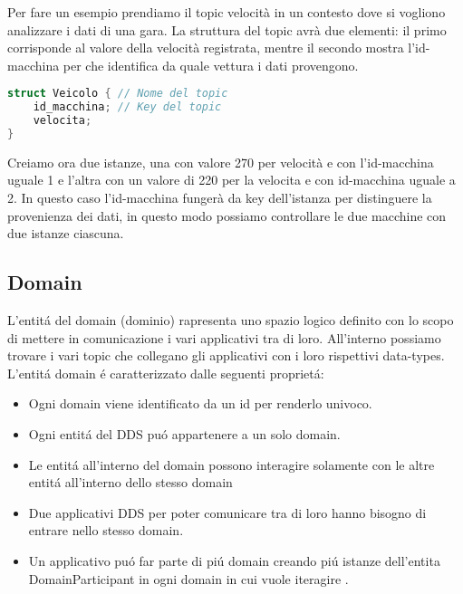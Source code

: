Per fare un esempio prendiamo il topic velocità in un contesto dove si
vogliono analizzare i dati di una gara.
La struttura del topic avrà due elementi: il primo corrisponde al valore
della velocità registrata, mentre il secondo mostra l'id-macchina per 
che identifica da quale vettura i dati provengono.

\vspace{5mm} %
\begin{lstlisting}[language=C++, caption=Esempio di Topic con una key
    usando il linguaggio IDL.
    , label=Topic struct,
    captionpos=b]
struct Veicolo { // Nome del topic
    id_macchina; // Key del topic
    velocita;
}
\end{lstlisting}
\vspace{5mm}

Creiamo ora due istanze, una con valore 270 per velocità e con 
l'id-macchina uguale 1 e l'altra con un valore di 220 per la velocita e 
con id-macchina 
uguale a 2. In questo caso l'id-macchina fungerà da key 
dell'istanza per distinguere la provenienza dei dati, in questo
modo possiamo controllare le due macchine con due istanze ciascuna.



\subsection{Domain}
L'entitá del domain (dominio) rapresenta uno spazio logico definito con
lo scopo di mettere in comunicazione i vari applicativi tra di loro.
All'interno possiamo trovare i vari topic che collegano gli applicativi
con i loro rispettivi data-types.
L'entitá domain é caratterizzato dalle seguenti proprietá:
\begin{itemize}
    \item Ogni domain viene identificato da un id 
    per renderlo univoco.
    \item Ogni entitá del DDS puó appartenere
    a un solo domain.
    \item Le entitá all'interno del domain possono interagire
    solamente con le altre entitá all'interno dello stesso domain
    \item Due applicativi DDS per poter comunicare tra di loro
    hanno bisogno di entrare nello stesso domain.
    \item Un applicativo puó far parte di piú domain creando 
    piú istanze dell'entita DomainParticipant in ogni
    domain in cui vuole iteragire \cite{domainrti}.
\end{itemize}

